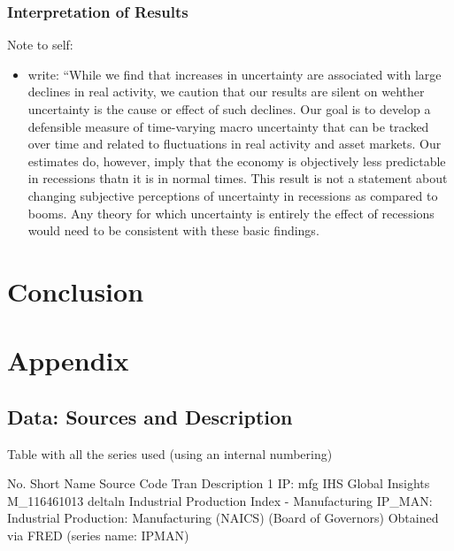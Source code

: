 \documentclass[a4paper,12pt,oneside,pointednumbers,bibtotoc,bigheadings,liststotoc]{scrbook}
\begin{document}
\subsection{Interpretation of Results}
\begingroup
    \fontsize{8pt}{12pt}\selectfont
    Note to self:
\begin{itemize}
	\item \citet[p. 1181]{juradoetal:15} write: ``While we find that increases in uncertainty are associated with large declines in real activity, we caution that our results are silent on wehther uncertainty is the cause or effect of such declines. Our goal is to develop a defensible measure of time-varying macro uncertainty that can be tracked over time and related to fluctuations in real activity and asset markets. Our estimates do, however, imply that the economy is objectively less predictable in recessions thatn it is in normal times. This result is not a statement about changing subjective perceptions of uncertainty in recessions as compared to booms. Any theory for which uncertainty is entirely the effect of recessions would need to be consistent with these basic findings.  
\end{itemize}
\endgroup

\chapter{Conclusion}
\label{Conclusion}




\newpage
\appendix

\chapter{Appendix}
\label{DataAndCode}
\section{Data: Sources and Description}
\label{sec:data}


Table with all the series used (using an internal numbering)



No.	Short Name	Source			Code			Tran 		Description
1	IP: mfg		IHS Global Insights	M_116461013		deltaln	Industrial Production Index - Manufacturing
IP_MAN: Industrial Production: Manufacturing (NAICS) (Board of Governors) Obtained via FRED (series name: IPMAN)
\end{document}
